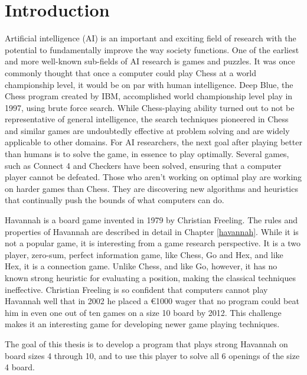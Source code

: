 

\section{Introduction}

Artificial intelligence (AI) is an important and exciting field of research with the potential to fundamentally improve the way society functions. One of the earliest and more well-known sub-fields of AI research is games and puzzles. It was once commonly thought that once a computer could play Chess at a world championship level, it would be on par with human intelligence. Deep Blue, the Chess program created by IBM, accomplished world championship level play in 1997, using brute force search. While Chess-playing ability turned out to not be representative of general intelligence, the search techniques pioneered in Chess and similar games are undoubtedly effective at problem solving and are widely applicable to other domains. For AI researchers, the next goal after playing better than humans is to solve the game, in essence to play optimally. Several games, such as Connect 4 and Checkers have been solved, ensuring that a computer player cannot be defeated. Those who aren't working on optimal play are working on harder games than Chess. They are discovering new algorithms and heuristics that  continually push the bounds of what computers can do.

Havannah is a board game invented in 1979 by Christian Freeling. The rules and properties of Havannah are described in detail in Chapter \ref{havannah}. While it is not a popular game, it is interesting from a game research perspective. It is a two player, zero-sum, perfect information game, like Chess, Go and Hex, and like Hex, it is a connection game. Unlike Chess, and like Go, however, it has no known strong heuristic for evaluating a position, making the classical techniques ineffective. Christian Freeling is so confident that computers cannot play Havannah well that in 2002 he placed a \euro 1000 wager that no program could beat him in even one out of ten games on a size 10 board by 2012. This challenge makes it an interesting game for developing newer game playing techniques.

The goal of this thesis is to develop a program that plays strong Havannah on board sizes 4 through 10, and to use this player to solve all 6 openings of the size 4 board.



